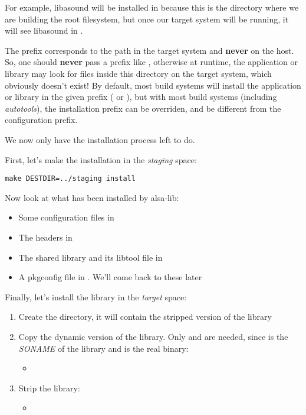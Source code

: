 For example, libasound will be installed in
 because this is
the directory where we are building the root filesystem, but once our
target system will be running, it will see libasound in
.

The prefix corresponds to the path in the target system and {\bf
  never} on the host. So, one should {\bf never} pass a prefix like
, otherwise at
runtime, the application or library may look for files inside this
directory on the target system, which obviously doesn't exist! By
default, most build systems will install the application or library in
the given prefix ( or ), but with most
build systems (including {\em autotools}), the installation prefix can
be overriden, and be different from the configuration prefix.

We now only have the installation process left to do.

First, let's make the installation in the {\em staging} space:
\begin{verbatim}
make DESTDIR=../staging install
\end{verbatim}

Now look at what has been installed by alsa-lib:
\begin{itemize}
\item Some configuration files in 
\item The headers in 
\item The shared library and its libtool file in 
\item A pkgconfig file in . We'll come back
  to these later
\end{itemize}

Finally, let's install the library in the {\em target} space:

\begin{enumerate}
\item Create the  directory, it will contain the
  stripped version of the library
\item Copy the dynamic version of the library. Only
   and  are needed,
  since  is the {\em SONAME} of the library and
   is the real binary:
  \begin{itemize}
  \item {}
  \end{itemize}
\item Strip the library:
  \begin{itemize}
  \item {}
  \end{itemize}
\end{enumerate}

